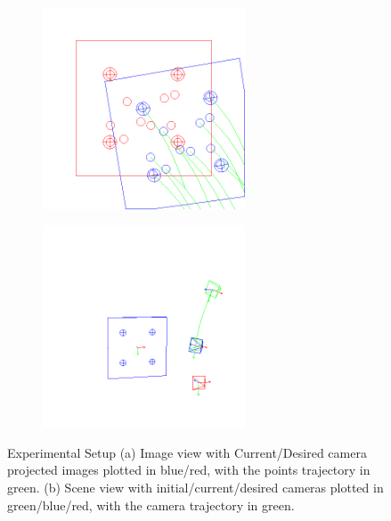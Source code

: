 \begin{figure}[ht!]
\centering
\begin{adjustbox}{minipage=.9\linewidth,margin=1ex,bgcolor=black!5,margin=0.3pt,bgcolor=black!30,margin=2ex}
  \centering
  \begin{subfigure}{.48\textwidth}
    \centering
    \includegraphics[width=60mm]{figures/rescamera.png}
    \caption{}
    \label{fig:rescamera}
  \end{subfigure}
  \begin{subfigure}{.48\textwidth}
    \centering
    \includegraphics[width=60mm]{figures/resscene.png}
    \caption{}
    \label{fig:resscene}
  \end{subfigure}
  \caption{Experimental Setup (a) Image view with Current/Desired camera projected images plotted in blue/red, with the points trajectory in green. (b) Scene view with initial/current/desired cameras plotted in green/blue/red, with the camera trajectory in green.}
  \label{fig:ressetup}
  \end{adjustbox}
\end{figure}

